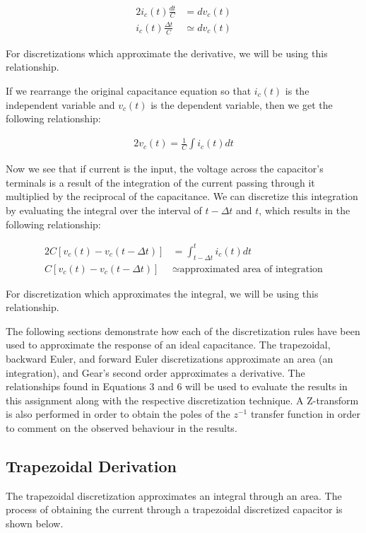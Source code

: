 \documentclass[10pt, oneside, letterpaper]{article}
\begin{document}
\begin{alignat}{2}
  i_c(t)\frac{dt}{C} &= dv_c(t) \\
  i_c(t)\frac{\Delta{}t}{C} &\simeq dv_c(t) 
\end{alignat}

For discretizations which approximate the derivative, we will be using this relationship.

If we rearrange the original capacitance equation so that $i_c(t)$ is the independent variable and $v_c(t)$ is the dependent variable, then we get the following relationship:

\begin{alignat}{2}
  v_c(t) = \frac{1}{C}\int{i_c(t)dt}
\end{alignat}

Now we see that if current is the input, the voltage across the capacitor's terminals is a result of the integration of the current passing through it multiplied by the reciprocal of the capacitance. We can discretize this integration by evaluating the integral over the interval of $t - \Delta{}t$ and $t$, which results in the following relationship:

\begin{alignat}{2}
  C\left[v_c(t)-v_c(t-\Delta{}t)\right] &= \int_{t-\Delta{}t}^{t}i_c(t)dt \\
  C\left[v_c(t)-v_c(t-\Delta{}t)\right] &\simeq \text{approximated area of integration}
\end{alignat}

For discretization which approximates the integral, we will be using this relationship.

The following sections demonstrate how each of the discretization rules have been used to approximate the response of an ideal capacitance. The trapezoidal, backward Euler, and forward Euler discretizations approximate an area (an integration), and Gear's second order approximates a derivative. The relationships found in Equations 3 and 6 will be used to evaluate the results in this assignment along with the respective discretization technique. A Z-transform is also performed in order to obtain the poles of the $z^{-1}$ transfer function in order to comment on the observed behaviour in the results.

\subsection{Trapezoidal Derivation}

The trapezoidal discretization approximates an integral through an area. The process of obtaining the current through a trapezoidal discretized capacitor is shown below.
\end{document}
